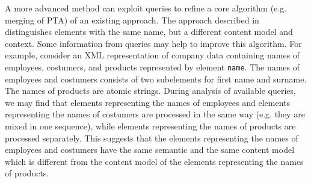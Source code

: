 A more advanced method can exploit queries to refine a core algorithm (e.g. merging of PTA) of an existing approach. The approach described in \cite{Vosta:2008:EAC:1802514.1802522} distinguishes elements with the same name, but a different content model and context. Some information from queries may help to improve this algorithm. For example, consider an XML representation of company data containing names of employees, costumers, and products represented by element \texttt{name}. The names of employees and costumers consists of two subelements for first name and surname. The names of products are atomic strings. During analysis of available queries, we may find that elements representing the names of employees and elements representing the names of costumers are processed in the same way (e.g. they are mixed in one sequence), while elements representing the names of products are processed separately. This suggests that the elements representing the names of employees and costumers have the same semantic and the same content model which is different from the content model of the elements representing the names of products.